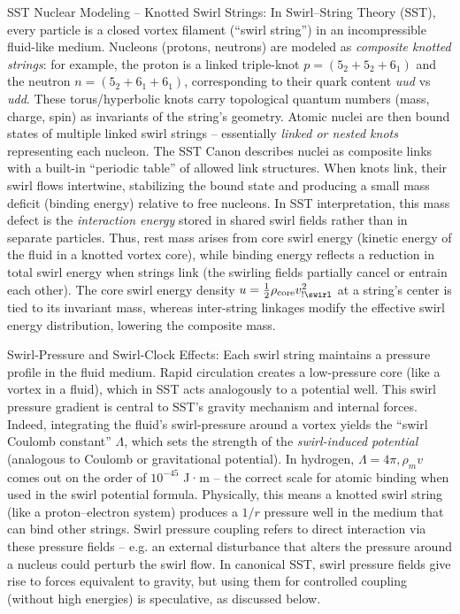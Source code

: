 \documentclass[11pt]{article}
\begin{document}
SST Nuclear Modeling – Knotted Swirl Strings: In Swirl–String Theory (SST), every particle is a closed vortex filament (“swirl string”) in an incompressible fluid-like medium. Nucleons (protons, neutrons) are modeled as \textit{composite knotted strings}: for example, the proton is a linked triple-knot $p=(5_2 + 5_2 + 6_1)$ and the neutron $n=(5_2 + 6_1 + 6_1)$, corresponding to their quark content \textit{uud} vs \textit{udd}. These torus/hyperbolic knots carry topological quantum numbers (mass, charge, spin) as invariants of the string’s geometry. Atomic nuclei are then bound states of multiple linked swirl strings – essentially \textit{linked or nested knots} representing each nucleon. The SST Canon describes nuclei as composite links with a built-in “periodic table” of allowed link structures. When knots link, their swirl flows intertwine, stabilizing the bound state and producing a small mass deficit (binding energy) relative to free nucleons. In SST interpretation, this mass defect is the \textit{interaction energy} stored in shared swirl fields rather than in separate particles. Thus, rest mass arises from core swirl energy (kinetic energy of the fluid in a knotted vortex core), while binding energy reflects a reduction in total swirl energy when strings link (the swirling fields partially cancel or entrain each other). The core swirl energy density $u = \tfrac{1}{2}\rho_{\text{core}} v_{!\swirl}^2$ at a string’s center is tied to its invariant mass, whereas inter-string linkages modify the effective swirl energy distribution, lowering the composite mass.


Swirl-Pressure and Swirl-Clock Effects: Each swirl string maintains a pressure profile in the fluid medium. Rapid circulation creates a low-pressure core (like a vortex in a fluid), which in SST acts analogously to a potential well. This swirl pressure gradient is central to SST’s gravity mechanism and internal forces. Indeed, integrating the fluid’s swirl-pressure around a vortex yields the “swirl Coulomb constant” $\Lambda$, which sets the strength of the \textit{swirl-induced potential} (analogous to Coulomb or gravitational potential). In hydrogen, $\Lambda=4\pi,\rho_{m}v$ comes out on the order of $10^{-45}$ J·m – the correct scale for atomic binding when used in the swirl potential formula. Physically, this means a knotted swirl string (like a proton–electron system) produces a $1/r$ pressure well in the medium that can bind other strings. Swirl pressure coupling refers to direct interaction via these pressure fields – e.g. an external disturbance that alters the pressure around a nucleus could perturb the swirl flow. In canonical SST, swirl pressure fields give rise to forces equivalent to gravity, but using them for controlled coupling (without high energies) is speculative, as discussed below.
\end{document}

